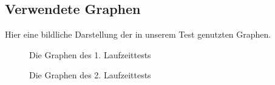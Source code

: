 \documentclass[a4paper]{llncs}
\begin{document}
\subsection{Verwendete Graphen}
Hier eine bildliche Darstellung der in unserem Test genutzten Graphen.

\begin{figure}
\label{fig:testgraph1}
\caption{Die Graphen des 1. Laufzeittests} 
\end{figure}

\begin{figure}
\label{fig:testgraph2}
\caption{Die Graphen des 2. Laufzeittests} 
\end{figure}
\end{document}
